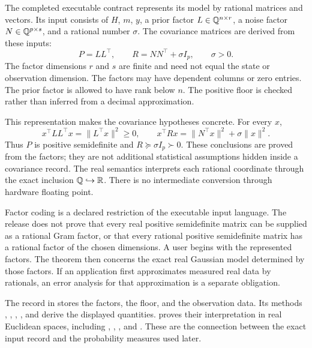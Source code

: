 The completed executable contract represents its model by rational matrices and vectors. Its input consists of $H$, $m$, $y$, a prior factor $L\in\mathbb Q^{n\times r}$, a noise factor $N\in\mathbb Q^{p\times s}$, and a rational number $\sigma$. The covariance matrices are derived from these inputs:
\begin{equation}
 P=LL^\top,\qquad R=NN^\top+\sigma I_p,\qquad \sigma>0.
 \label{eq:foundation-factor-model}
\end{equation}
The factor dimensions $r$ and $s$ are finite and need not equal the state or observation dimension. The factors may have dependent columns or zero entries. The prior factor is allowed to have rank below $n$. The positive floor is checked rather than inferred from a decimal approximation.

This representation makes the covariance hypotheses concrete. For every $x$,
\[
 x^\top LL^\top x=\|L^\top x\|^2\ge0,
 \qquad
 x^\top Rx=\|N^\top x\|^2+\sigma\|x\|^2.
\]
Thus $P$ is positive semidefinite and $R\succeq\sigma I_p\succ0$. These conclusions are proved from the factors; they are not additional statistical assumptions hidden inside a covariance record. The real semantics interprets each rational coordinate through the exact inclusion $\mathbb Q\hookrightarrow\mathbb R$. There is no intermediate conversion through hardware floating point.

Factor coding is a declared restriction of the executable input language. The release does not prove that every real positive semidefinite matrix can be supplied as a rational Gram factor, or that every rational positive semidefinite matrix has a rational factor of the chosen dimensions. A user begins with the represented factors. The theorem then concerns the exact real Gaussian model determined by those factors. If an application first approximates measured real data by rationals, an error analysis for that approximation is a separate obligation.

The record  in  stores the factors, the floor, and the observation data. Its methods , , , , and  derive the displayed quantities.  proves their interpretation in real Euclidean spaces, including , , , and . These are the connection between the exact input record and the probability measures used later.

